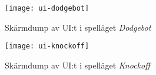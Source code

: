 \begin{figure}[t]
    \centering
    \texttt{[image: ui-dodgebot]}
    \caption{Skärmdump av UI:t i spelläget \textit{Dodgebot}}
    \label{fig:ui-dodgebot}
\end{figure}

\begin{figure}[b]
    \centering
    \texttt{[image: ui-knockoff]}
    \caption{Skärmdump av UI:t i spelläget \textit{Knockoff}}
    \label{fig:ui-knockoff}
\end{figure}